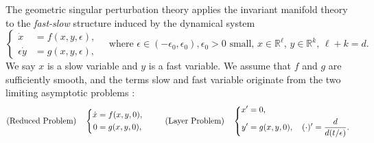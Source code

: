 \documentclass[11pt]{article}
\newcommand{\tcr}{}
\newcommand{\tcb}{}
\theoremstyle{remark}
\begin{document}
The geometric singular perturbation theory \cite[Theorem 9.1]{fenichel_geometric_1979} applies the invariant manifold theory
to the {\it fast-slow} structure induced by the dynamical system
%
\begin{equation} \label{eq:fast-slow}
 \left\{
 \begin{aligned}
  \dot{x}&=f(x,y,\epsilon),\\
  \epsilon\dot{y}&=g(x,y,\epsilon),
 \end{aligned}\right. \quad \text{where $\epsilon \in (-\epsilon_0,\epsilon_0), \epsilon_0>0$ small, $x\in \mathbb{R}^\ell$, $y\in \mathbb{R}^k$, $\ell+k=d$.}
\end{equation}
We say $x$ is a slow variable and $y$ is a fast variable. We assume that $f$ and $g$ are sufficiently smooth,
and the terms slow and fast variable originate from
the two limiting asymptotic problems :
\begin{equation*} %
 \text{(Reduced Problem)}\quad\left\{
 \begin{aligned}
    \dot{x} &= f(x,y,0),\\
    0&= g(x,y,0),
 \end{aligned}\right.
 \hspace{2.5em}
 \text{(Layer Problem)} \quad
 \left\{
 \begin{aligned}
    x'&= 0,\\
    y'&= g(x,y,0), \quad (\cdot)' = \frac{d}{d(t/\epsilon)}.%
 \end{aligned}\right.
\end{equation*}
\end{document}
